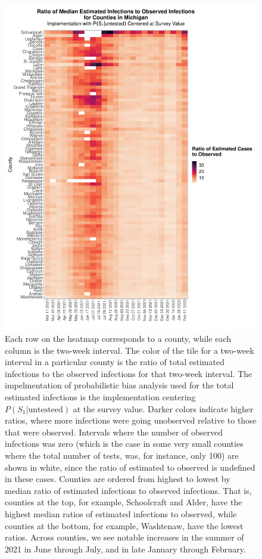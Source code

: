 \documentclass[12pt,twoside]{smiththesis}
\begin{document}
\begin{figure}
\includegraphics[width=1\linewidth]{figure/mi_county_heatmap_ratio_est_observed} \caption{\label{fig:mi-county-heatmap}Each row on the heatmap corresponds to a county, while each column is the two-week interval. The color of the tile for a two-week interval in a particular county is the ratio of total estimated infections to the observed infections for that two-week interval. The impelmentation of probabilistic bias analysis used for the total estimated infections is the implementation centering $P(S_1|\text{untesteed})$ at the survey value. Darker colors indicate higher ratios, where more infections were going unobserved relative to those that were observed. Intervals where the number of observed infections was zero (which is the case in some very small counties where the total number of tests, was, for instance, only 100) are shown in white, since the ratio of estimated to observed is undefined in these cases. Counties are ordered from highest to lowest by median ratio of estimated infections to observed infections. That is, counties at the top, for example, Schoolcraft and Alder, have the highest median ratios of estimated infections to observed, while counties at the bottom, for example, Washtenaw, have the lowest ratios. Across counties, we see notable increases in the summer of 2021 in June through July, and in late January through February.}\label{fig:unnamed-chunk-84}
\end{figure}
\end{document}
